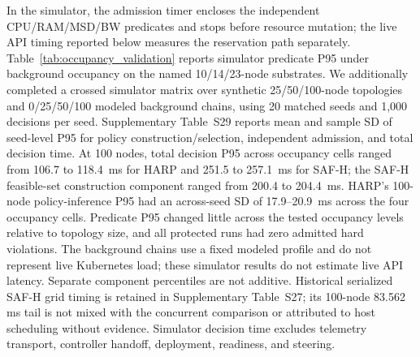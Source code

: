 \documentclass[final,5p]{elsarticle}
\newcommand{\rev}[1]{\textcolor{revisiongreen}{#1}}
\let\newrev\rev
\begin{document}
\newrev{In the simulator, the admission timer encloses the independent CPU/RAM/MSD/BW predicates and stops before resource mutation; the live API timing reported below measures the reservation path separately. Table~\ref{tab:occupancy_validation} reports simulator predicate P95 under background occupancy on the named 10/14/23-node substrates. We additionally completed a crossed simulator matrix over synthetic 25/50/100-node topologies and 0/25/50/100 modeled background chains, using 20 matched seeds and 1,000 decisions per seed. Supplementary Table~S29 reports mean and sample SD of seed-level P95 for policy construction/selection, independent admission, and total decision time. At 100 nodes, total decision P95 across occupancy cells ranged from 106.7 to 118.4~ms for HARP and 251.5 to 257.1~ms for SAF-H; the SAF-H feasible-set construction component ranged from 200.4 to 204.4~ms. HARP's 100-node policy-inference P95 had an across-seed SD of 17.9--20.9~ms across the four occupancy cells. Predicate P95 changed little across the tested occupancy levels relative to topology size, and all protected runs had zero admitted hard violations. The background chains use a fixed modeled profile and do not represent live Kubernetes load; these simulator results do not estimate live API latency. Separate component percentiles are not additive. Historical serialized SAF-H grid timing is retained in Supplementary Table~S27; its 100-node 83.562 ms tail is not mixed with the concurrent comparison or attributed to host scheduling without evidence. Simulator decision time excludes telemetry transport, controller handoff, deployment, readiness, and steering.}
\end{document}
